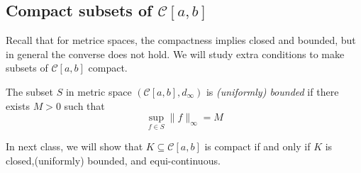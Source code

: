 \subsection{Compact subsets of $\mathcal{C}[a,b]$}

Recall that for metrice spaces, the compactness implies closed and bounded, but in general the converse does not hold. We will study extra conditions to make subsets of $\mathcal{C}[a,b]$ compact.
\begin{definition}
The subset $S$ in metric space $(\mathcal{C}[a,b],d_\infty)$ is \emph{(uniformly) bounded} if there exists $M>0$ such that
\[
\sup_{f\in S}\|f\|_\infty = M
\]
\end{definition}
In next class, we will show that $K\subseteq\mathcal{C}[a,b]$ is compact if and only if 
$K$ is closed,(uniformly) bounded, and equi-continuous.













